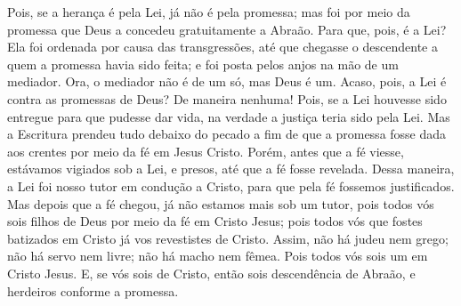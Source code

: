 {  Pois, se a herança é pela Lei, já não é pela promessa; mas foi por meio da promessa que Deus a concedeu gratuitamente a Abraão.
  Para que, pois, é a Lei? Ela foi ordenada por causa das transgressões, até que chegasse o descendente
 a quem a promessa havia sido feita; e foi posta pelos anjos na mão de um mediador.
  Ora, o mediador não é de um só, mas Deus é um.
  Acaso, pois, a Lei é contra as promessas de Deus? De maneira nenhuma! Pois, se a Lei houvesse sido entregue para que pudesse dar vida, na verdade a justiça teria sido pela Lei.
  Mas a Escritura prendeu tudo debaixo do pecado a fim de que a promessa fosse dada aos crentes por meio da fé em Jesus Cristo.
  Porém, antes que a fé viesse, estávamos vigiados sob a Lei, e presos, até que a fé fosse revelada.
  Dessa maneira, a Lei foi nosso tutor em condução a Cristo, para que pela fé fossemos justificados.
  Mas depois que a fé chegou, já não estamos mais sob um tutor,
  pois todos vós sois filhos de Deus por meio da fé em Cristo Jesus;
  pois todos vós que fostes batizados em Cristo já vos revestistes de Cristo.
  Assim, não há judeu nem grego; não há servo nem livre; não há macho nem fêmea. Pois todos vós sois um em Cristo Jesus.
  E, se vós sois de Cristo, então sois descendência
 de Abraão, e herdeiros conforme a promessa.
\par }


